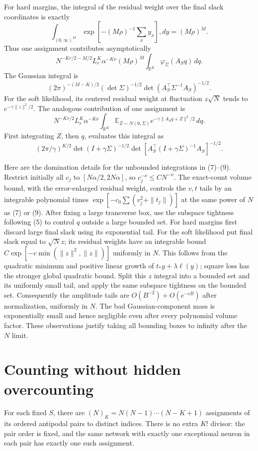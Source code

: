 \documentclass[11pt]{article}
\newcommand{\E}{\mathbb E}\newcommand{\R}{\mathbb R}
\begin{document}
For hard margins, the integral of the residual weight over the final
slack coordinates is exactly
\[
 \int_{(0,\infty)^M}
       \exp[-(M\rho)^{-1}\textstyle\sum_x y_x],dy=(M\rho)^M.
\]
Thus one assignment contributes asymptotically
\[
 N^{-Kr/2-M/2}L_r^K\alpha^{-K\nu}(M\rho)^M
                  \int_{\R^K}\varphi_\Sigma(A_Sq)\,dq.
 \tag{7}
\]
The Gaussian integral is
\[
 (2\pi)^{-(M-K)/2}(\det\Sigma)^{-1/2}
                     \det(A_S^\top\Sigma^{-1}A_S)^{-1/2}.
 \tag{8}
\]
For the soft likelihood, its centered residual weight at fluctuation
$z\sqrt N$ tends to $e^{-\gamma\|z\|^2/2}$. The analogous contribution
of one assignment is
\[
 N^{-Kr/2}L_r^K\alpha^{-K\nu}
       \int_{\R^K}\E_{Z\sim N(0,\Sigma)}
                  e^{-\gamma\|A_Sq+Z\|^2/2}\,dq.
 \tag{9}
\]
First integrating $Z$, then $q$, evaluates this integral as
\[
 (2\pi/\gamma)^{K/2}\det(I+\gamma\Sigma)^{-1/2}
       \det[A_S^\top(I+\gamma\Sigma)^{-1}A_S]^{-1/2}.\tag{10}
\]

Here are the domination details for the unbounded integrations in
(7)--(9). Restrict initially all $c_j$ to
$[N\alpha/2,2N\alpha]$, so $c_j^{-\nu}\le CN^{-\nu}$.
The exact-count volume bound, with the error-enlarged residual weight,
controls the $v,t$ tails by an integrable polynomial times
$\exp[-c_0\sum(v_j^2+\|t_j\|)]$ at the same power of $N$ as (7) or
(9). After fixing a large transverse box, use the subspace tightness
following (5) to control $q$ outside a large bounded set. For hard
margins first discard large final slack using its exponential tail.
For the soft likelihood put final slack equal to $\sqrt N z$;
its residual weights have an integrable bound
$C\exp[-c\min(\|z\|^2,\|z\|)]$ uniformly in $N$.
This follows from the quadratic minimum and positive linear growth of
$t_*y+\lambda\ell(y)$; square loss has the stronger global quadratic
bound. Split this $z$ integral into a bounded set and its uniformly
small tail, and apply the same subspace tightness on the bounded set.
Consequently the amplitude tails are $O(B^{-2})+O(e^{-cB})$ after
normalization, uniformly in $N$. The bad Gaussian-component mass is
exponentially small and hence negligible even after every polynomial
volume factor. These observations justify taking all bounding boxes
to infinity after the $N$ limit.

\section{Counting without hidden overcounting}
For each fixed $S$, there are $(N)_K=N(N-1)\cdots(N-K+1)$ assignments
of its ordered antipodal pairs to distinct indices. There is no extra
$K!$ divisor: the pair order is fixed, and the same network with exactly
one exceptional neuron in each pair has exactly one such assignment.
\end{document}
